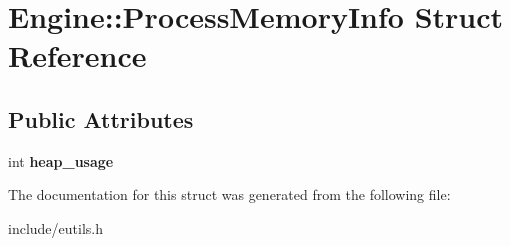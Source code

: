 \hypertarget{structEngine_1_1ProcessMemoryInfo}{}\section{Engine\+:\+:Process\+Memory\+Info Struct Reference}
\label{structEngine_1_1ProcessMemoryInfo}
\subsection*{Public Attributes}
\begin{DoxyCompactItemize}
\item 
\hypertarget{structEngine_1_1ProcessMemoryInfo_af41f3e1cc8fe9127c756bbbdc36e0e71}{}int {\bfseries heap\+\_\+usage}\label{structEngine_1_1ProcessMemoryInfo_af41f3e1cc8fe9127c756bbbdc36e0e71}

\end{DoxyCompactItemize}


The documentation for this struct was generated from the following file\+:\begin{DoxyCompactItemize}
\item 
include/eutils.\+h\end{DoxyCompactItemize}
